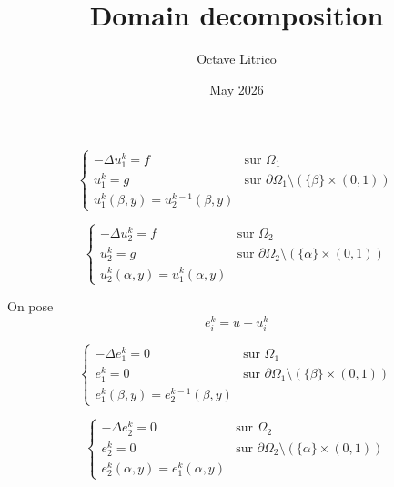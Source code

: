 \documentclass{article}
\title{Domain decomposition}
\author{Octave Litrico}
\date{May 2026}
\begin{document}
\maketitle


\begin{equation}
\begin{cases}
-\Delta u_1^k = f & \text{sur } \Omega_1 \\[4pt]
u_1^k = g & \text{sur } \partial \Omega_1 \setminus (\{\beta\}\times(0,1)) \\[4pt]
u_1^k(\beta,y) = u_2^{k-1}(\beta,y)
\end{cases}
\end{equation}

\begin{equation}
\begin{cases}
-\Delta u_2^k = f & \text{sur } \Omega_2 \\[4pt]
u_2^k = g & \text{sur } \partial \Omega_2 \setminus (\{\alpha\}\times(0,1)) \\[4pt]
u_2^k(\alpha,y) = u_1^k(\alpha,y)
\end{cases}
\end{equation}


On pose
\[
e_i^k = u - u_i^k
\]

\begin{equation}
\begin{cases}
-\Delta e_1^k = 0 & \text{sur } \Omega_1 \\[4pt]
e_1^k = 0 & \text{sur } \partial \Omega_1 \setminus (\{\beta\}\times(0,1)) \\[4pt]
e_1^k(\beta,y) = e_2^{k-1}(\beta,y)
\end{cases}
\label{eq:def1}
\end{equation}

\begin{equation}
\begin{cases}
-\Delta e_2^k = 0 & \text{sur } \Omega_2 \\[4pt]
e_2^k = 0 & \text{sur } \partial \Omega_2 \setminus (\{\alpha\}\times(0,1)) \\[4pt]
e_2^k(\alpha,y) = e_1^k(\alpha,y)
\end{cases}
\end{equation}

\end{document}
